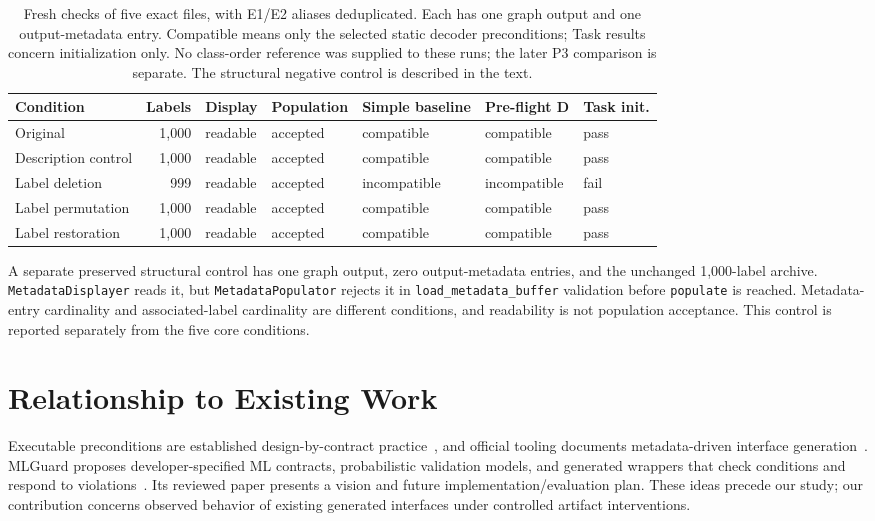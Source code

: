 \documentclass[10pt,twocolumn,letterpaper]{article}
\newcommand{\code}[1]{\texttt{#1}}
\begin{document}
\begin{table}[t]
\centering\small
\setlength{\tabcolsep}{7pt}
\begin{tabular}{@{}lrlllll@{}}
\toprule
Condition & Labels & Display & Population & Simple baseline & Pre-flight D & Task init.\\
\midrule
Original & 1,000 & readable & accepted & compatible & compatible & pass\\
Description control & 1,000 & readable & accepted & compatible & compatible & pass\\
Label deletion & 999 & readable & accepted & incompatible & incompatible & fail\\
Label permutation & 1,000 & readable & accepted & compatible & compatible & pass\\
Label restoration & 1,000 & readable & accepted & compatible & compatible & pass\\
\bottomrule
\end{tabular}
\caption{Fresh checks of five exact files, with E1/E2 aliases deduplicated. Each has one graph output and one output-metadata entry. Compatible means only the selected static decoder preconditions; Task results concern initialization only. No class-order reference was supplied to these runs; the later P3 comparison is separate. The structural negative control is described in the text.}
\label{tab:baseline}
\end{table}

A separate preserved structural control has one graph output, zero output-metadata entries, and the unchanged 1,000-label archive. \code{MetadataDisplayer} reads it, but \code{MetadataPopulator} rejects it in \code{load\_metadata\_buffer} validation before \code{populate} is reached. Metadata-entry cardinality and associated-label cardinality are different conditions, and readability is not population acceptance. This control is reported separately from the five core conditions.

\section{Relationship to Existing Work}
Executable preconditions are established design-by-contract practice~\cite{meyer}, and official tooling documents metadata-driven interface generation~\cite{codegen-doc}. MLGuard proposes developer-specified ML contracts, probabilistic validation models, and generated wrappers that check conditions and respond to violations~\cite{mlguard}. Its reviewed paper presents a vision and future implementation/evaluation plan. These ideas precede our study; our contribution concerns observed behavior of existing generated interfaces under controlled artifact interventions.
\end{document}
